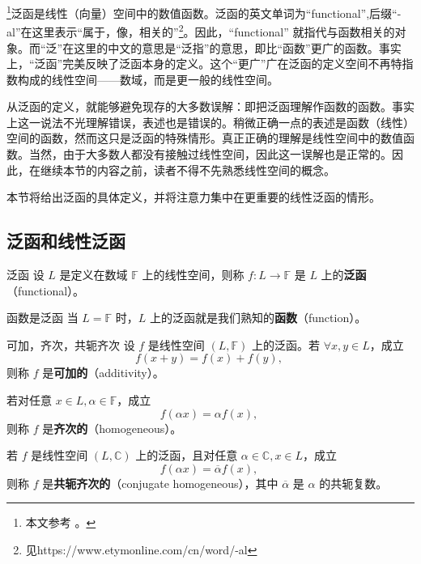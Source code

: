 
\footnote{本文参考 \cite{Ke1}。}泛函是线性（向量）空间中的数值函数。泛函的英文单词为“functional”,后缀“-al”在这里表示“属于，像，相关的”\footnote{见https://www.etymonline.com/cn/word/-al}。因此，“functional” 就指代与函数相关的对象。而“泛”在这里的中文的意思是“泛指”的意思，即比“函数”更广的函数。事实上，“泛函”完美反映了泛函本身的定义。这个“更广”广在泛函的定义空间不再特指数构成的线性空间——数域，而是更一般的线性空间。

从泛函的定义，就能够避免现存的大多数误解：即把泛函理解作函数的函数。事实上这一说法不光理解错误，表述也是错误的。稍微正确一点的表述是函数（线性）空间的函数，然而这只是泛函的特殊情形。真正正确的理解是线性空间中的数值函数。当然，由于大多数人都没有接触过线性空间，因此这一误解也是正常的。因此，在继续本节的内容之前，读者不得不先熟悉线性空间的概念。

本节将给出泛函的具体定义，并将注意力集中在更重要的线性泛函的情形。

\subsection{泛函和线性泛函}
\begin{definition}{泛函}
设 $L$ 是定义在数域 $\mathbb F$ 上的线性空间，则称 $f:L\rightarrow\mathbb F$ 是 $L$ 上的\textbf{泛函}（functional）。
\end{definition}

\begin{example}{函数是泛函}
当 $L=\mathbb F$ 时，$L$ 上的泛函就是我们熟知的\textbf{函数}（function）。
\end{example}

\begin{definition}{可加，齐次，共轭齐次}
设 $f$ 是线性空间 $(L,\mathbb F)$ 上的泛函。若 $\forall x,y\in L$，成立
\begin{equation}
f(x+y)=f(x)+f(y),~
\end{equation}
则称 $f$ 是\textbf{可加的}（additivity）。

若对任意 $x\in L,\alpha\in\mathbb F$，成立
\begin{equation}
f(\alpha x)=\alpha f(x),~
\end{equation}
则称 $f$ 是\textbf{齐次的}（homogeneous）。

若 $f$ 是线性空间 $(L,\mathbb C)$ 上的泛函，且对任意 $\alpha\in\mathbb C,x\in L$，成立
\begin{equation}
f(\alpha x)=\overline\alpha f(x),~
\end{equation}
则称 $f$ 是\textbf{共轭齐次的}（conjugate homogeneous），其中 $\overline\alpha$ 是 $\alpha$ 的共轭复数。
\end{definition}

